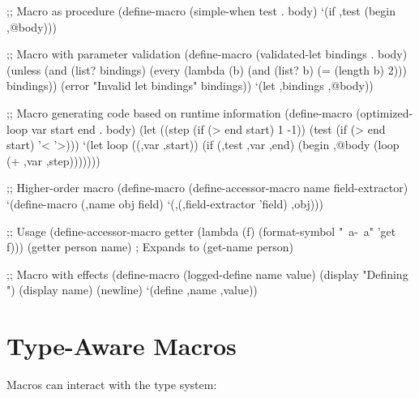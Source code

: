 \begin{example}
\begin{lambdustcode}
;; Macro as procedure
(define-macro (simple-when test . body)
  `(if ,test (begin ,@body)))

;; Macro with parameter validation
(define-macro (validated-let bindings . body)
  (unless (and (list? bindings)
               (every (lambda (b) (and (list? b) (= (length b) 2)))
                      bindings))
    (error "Invalid let bindings" bindings))
  `(let ,bindings ,@body))

;; Macro generating code based on runtime information
(define-macro (optimized-loop var start end . body)
  (let ((step (if (> end start) 1 -1))
        (test (if (> end start) '< '>)))
    `(let loop ((,var ,start))
       (if (,test ,var ,end)
           (begin ,@body (loop (+ ,var ,step)))))))

;; Higher-order macro  
(define-macro (define-accessor-macro name field-extractor)
  `(define-macro (,name obj field)
     `(,(,field-extractor 'field) ,obj)))

;; Usage
(define-accessor-macro getter (lambda (f) (format-symbol "~a-~a" 'get f)))
(getter person name)  ; Expands to (get-name person)

;; Macro with effects
(define-macro (logged-define name value)
  (display "Defining ") (display name) (newline)
  `(define ,name ,value))
\end{lambdustcode}
\end{example}

\section{Type-Aware Macros}
\label{sec:type-aware-macros}


Macros can interact with the type system:

